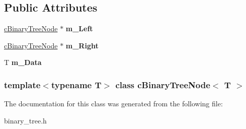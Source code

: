 \subsection*{\-Public \-Attributes}
\begin{DoxyCompactItemize}
\item 
\hypertarget{classcBinaryTreeNode_a62e29fcaccbb2ebd21f80d42f35c3423}{
\hyperlink{classcBinaryTreeNode}{c\-Binary\-Tree\-Node} $\ast$ {\bfseries m\-\_\-\-Left}}
\label{classcBinaryTreeNode_a62e29fcaccbb2ebd21f80d42f35c3423}

\item 
\hypertarget{classcBinaryTreeNode_a47d616ba011b71256666548d2d7903cd}{
\hyperlink{classcBinaryTreeNode}{c\-Binary\-Tree\-Node} $\ast$ {\bfseries m\-\_\-\-Right}}
\label{classcBinaryTreeNode_a47d616ba011b71256666548d2d7903cd}

\item 
\hypertarget{classcBinaryTreeNode_aa04bc6e4c65d705f99155a4d6d561bb9}{
\-T {\bfseries m\-\_\-\-Data}}
\label{classcBinaryTreeNode_aa04bc6e4c65d705f99155a4d6d561bb9}

\end{DoxyCompactItemize}
\subsubsection*{template$<$typename T$>$ class c\-Binary\-Tree\-Node$<$ T $>$}



\-The documentation for this class was generated from the following file\-:\begin{DoxyCompactItemize}
\item 
binary\-\_\-tree.\-h\end{DoxyCompactItemize}
